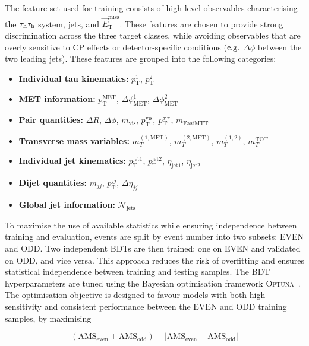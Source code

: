The feature set used for training consists of high-level observables characterising the $\tau_\mathrm{h}\tau_\mathrm{h}$ system, jets, and $\vec{E}^{\text{miss}}_\text{T}$. These features are chosen to provide strong discrimination across the three target classes, while avoiding observables that are overly sensitive to CP effects or detector-specific conditions ($\mbox{e.g.}$ $\Delta\phi$ between the two leading jets). These features are grouped into the following categories: 
\begin{itemize}
    \item \textbf{Individual tau kinematics:} $p_\text{T}^{1}$, $p_\text{T}^{2}$
    \item \textbf{MET information:} $p_\text{T}^{\text{MET}}$, $\Delta\phi^{1}_{\text{MET}}$, $\Delta\phi^{2}_{\text{MET}}$
    \item \textbf{Pair quantities:} $\Delta R$, $\Delta\phi$, $m_{\text{vis}}$, $p_\text{T}^{\text{vis}}$, $p_\text{T}^{\tau\tau}$, $m_{\text{FastMTT}}$
    \item \textbf{Transverse mass variables:} $m_{T}^{(1,\text{MET})}$, $m_{T}^{(2,\text{MET})}$, $m_{T}^{(1,2)}$, $m_T^{\text{TOT}}$
    \item \textbf{Individual jet kinematics:} $p_\text{T}^{\text{jet1}}$, $p_\text{T}^{\text{jet2}}$, $\eta_{\text{jet1}}$, $\eta_{\text{jet2}}$
    \item \textbf{Dijet quantities:} $m_{jj}$, $p_\text{T}^{jj}$, $\Delta\eta_{jj}$
    \item \textbf{Global jet information:} $\mathcal{N}_{\text{jets}}$
\end{itemize}

To maximise the use of available statistics while ensuring independence between training and evaluation, events are split by event number into two subsets: EVEN and ODD. 
Two independent \acp{BDT} are then trained: one on EVEN and validated on ODD, and vice versa. 
This approach reduces the risk of overfitting and ensures statistical independence between training and testing samples. The BDT hyperparameters are tuned using the Bayesian optimisation framework \textsc{Optuna}~\cite{akiba2019optunanextgenerationhyperparameteroptimization}. The optimisation objective is designed to favour models with both high sensitivity and consistent performance between the EVEN and ODD training samples, by maximising

\begin{equation}
    (\mathrm{AMS}_{\text{even}} + \mathrm{AMS}_{\text{odd}}) - |\mathrm{AMS}_{\text{even}} - \mathrm{AMS}_{\text{odd}}|
\end{equation}

